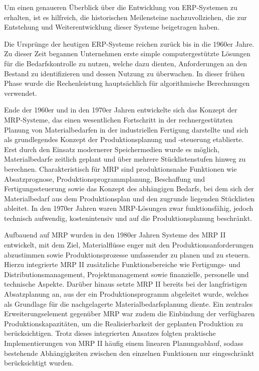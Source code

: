 Um einen genaueren Überblick über die Entwicklung von \ac{ERP}-Systemen zu erhalten, ist es hilfreich, die historischen Meilensteine nachzuvollziehen, die zur Entstehung und Weiterentwicklung dieser Systeme beigetragen haben.

Die Ursprünge der heutigen \ac{ERP}-Systeme reichen zurück bis in die 1960er Jahre. Zu dieser Zeit begannen Unternehmen erste simple computergestützte Lösungen für die Bedarfskontrolle zu nutzen, welche dazu dienten, Anforderungen an den Bestand zu identifizieren und dessen Nutzung zu überwachen. In dieser frühen Phase wurde die Rechenleistung hauptsächlich für algorithmische Berechnungen verwendet. \cite[\pagef 2ff]{bititci_strategic_1998}

Ende der 1960er und in den 1970er Jahren entwickelte sich das Konzept der \ac{MRP}-Systeme, das einen wesentlichen Fortschritt in der rechnergestützten Planung von Materialbedarfen in der industriellen Fertigung darstellte und sich als grundlegendes Konzept der Produktionsplanung und -steuerung etablierte. Erst durch den Einsatz modernerer Speichermedien wurde es möglich, Materialbedarfe zeitlich geplant und über mehrere Stücklistenstufen hinweg zu berechnen. Charakteristisch für \ac{MRP} sind produktionsnahe Funktionen wie Absatzprognose, Produktionsprogrammplanung, Beschaffung und Fertigungssteuerung sowie das Konzept des abhängigen Bedarfs, bei dem sich der Materialbedarf aus dem Produktionsplan und den zugrunde liegenden Stücklisten ableitet. In den 1970er Jahren waren \ac{MRP}-Lösungen zwar funktionsfähig, jedoch technisch aufwendig, kostenintensiv und auf die Produktionsplanung beschränkt. \cite[\pagef 358f]{robert_jacobs_enterprise_2007}

Aufbauend auf \ac{MRP} wurden in den 1980er Jahren Systeme des \ac{MRP II} entwickelt, mit dem Ziel, Materialflüsse enger mit den Produktionsanforderungen abzustimmen sowie Produktionsprozesse umfassender zu planen und zu steuern. Hierzu integrierte \ac{MRP II} zusätzliche Funktionsbereiche wie Fertigungs- und Distributionsmanagement, Projektmanagement sowie finanzielle, personelle und technische Aspekte. \cite[]{bititci_strategic_1998} Darüber hinaus setzte \ac{MRP II} bereits bei der langfristigen Absatzplanung an, aus der ein Produktionsprogramm abgeleitet wurde, welches als Grundlage für die nachgelagerte Materialbedarfsplanung diente. Ein zentrales Erweiterungselement gegenüber \ac{MRP} war zudem die Einbindung der verfügbaren Produktionskapazitäten, um die Realisierbarkeit der geplanten Produktion zu berücksichtigen. Trotz dieses integrierten Ansatzes folgten praktische Implementierungen von \ac{MRP II} häufig einem linearen Planungsablauf, sodass bestehende Abhängigkeiten zwischen den einzelnen Funktionen nur eingeschränkt berücksichtigt wurden. \cite[\pagef 144f]{klaus_what_2000}

